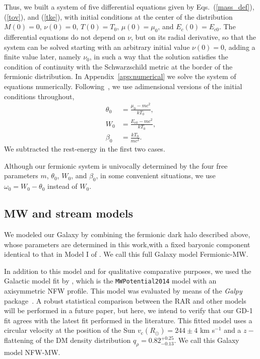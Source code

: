\documentclass[twocolumn]{aa}
\begin{document}
Thus, we built a system of five differential equations given
by Eqs.~(\ref{mass_def}), (\ref{tov}), and (\ref{tke}), with initial conditions
at the center of the distribution $M(0)=0$, $\nu(0)=0$, $T(0)=T_0$,
$\mu(0)=\mu_0$, and $E_c(0)=E_{c0}$.
The differential equations do not depend on $\nu$, but on its radial
derivative, so that the system can be solved starting with an arbitrary initial value $\nu(0)=0$, adding a finite value later, namely $\nu_0$, in such a way that the solution satisfies the condition of continuity with the Schwarzschild metric at the border of the fermionic distribution. In Appendix~\ref{app:numerical} we solve the system of equations numerically. Following~\cite{arguelles_novel_2018}, we use adimensional versions of the initial conditions throughout,
\begin{align}
    \theta_0 &= \frac{\mu_0 - mc^2}{kT_0},\nonumber\\
    W_0 &= \frac{E_{c0} - mc^2}{kT_0},\nonumber\\
    \beta_0 &= \frac{kT_0}{mc^2}.\label{rar_params}
\end{align}
We subtracted the rest-energy in the first two cases.

Although our fermionic system is univocally determined by the four free parameters $m$, $\theta_0$, $W_0$, and $\beta_0$, in some convenient situations, we use $\omega_0=W_0-\theta_0$ instead of $W_0$.




\subsection{MW and stream models}
\label{sec:MW_stream_models}

We modeled our Galaxy by combining the fermionic dark halo described above, whose parameters are determined in this work,with a fixed baryonic component identical to that in Model I of \citet{2017A&A...598A..66P}. We call this full Galaxy model Fermionic-MW.

In addition to this model and for qualitative comparative purposes, we used the Galactic model fit by \citet{2019MNRAS.486.2995M}, which is the {\texttt{MWPotential2014}} model with an axisymmetric NFW profile. This model was evaluated by means of the {\it Galpy} package~\citep{2015ApJS..216...29B}. A robust statistical comparison between the RAR and other models will be performed in a future paper, but here, we intend to verify that our GD-1 fit agrees with the latest fit performed in the literature. This fitted model uses a circular velocity at the position of the Sun $v_\mathrm{c}(R_\odot)=244 \pm 4$ km s$^{-1}$ and a $z-$flattening of the DM density distribution  $q_\rho=0.82^{+0.25}_{-0.13}$. We call this Galaxy model NFW-MW.
\end{document}
